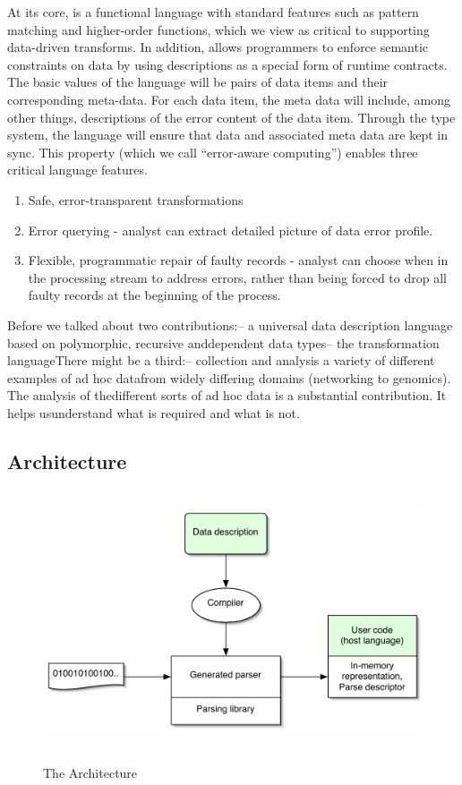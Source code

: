 
At its core, \datatype{} is a functional language with standard
features such as pattern matching and higher-order functions, which we
view as critical to supporting data-driven transforms. In addition,
\datatype{} allows programmers to enforce semantic constraints on
data by using \datatype{} descriptions as a special form of runtime
contracts. The basic values of the language will be pairs of data
items and their corresponding meta-data. For each data item, the meta
data will include, among other things, descriptions of the error
content of the data item. Through the type system, the language will
ensure that data and associated meta data are kept in sync. This
property (which we call ``error-aware computing'') enables three
critical language features.
\begin{enumerate}
\item Safe, error-transparent transformations
\item Error querying - analyst can extract detailed picture of data
  error profile.
\item Flexible, programmatic repair of faulty records - analyst can
  choose when in the processing stream to address errors, rather than
  being forced to drop all faulty records at the beginning of the process.
\end{enumerate}


Before we talked about two contributions:-- a universal data
description language based on polymorphic, recursive anddependent data
types-- the transformation languageThere might be a third:--
collection and analysis a variety of different examples of ad hoc
datafrom widely differing domains (networking to genomics).  The
analysis of thedifferent sorts of ad hoc data is a substantial
contribution.  It helps usunderstand what is required and what is not.

\subsection{\datatype{} Architecture}

\begin{figure}[tp]
  \includegraphics[height=3in,width=5in]{architecture}
\label{fig:pads-arch}
\caption{The \pads{} Architecture}
\end{figure}

